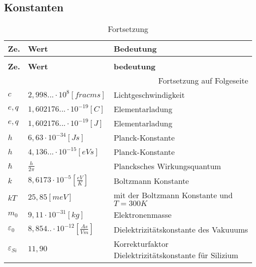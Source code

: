 \documentclass[12pt,a4paper]{report}%
\numberwithin{equation}{section}
\def\bracks#1{\left[ #1 \right]}
\begin{document}
	\subsection{Konstanten} \label{ch:constants}
	\renewcommand{\arraystretch}{1.5}
	
	\begin{longtable} {|p{0.6cm}|p{4.4cm}|p{8.4cm}|} \hline
	\textbf{Ze.} & \textbf{Wert} & \textbf{Bedeutung}\\
	\hline
	\endfirsthead %
	\caption{Fortsetzung}\\ \hline
	\textbf{Ze.} & \textbf{Wert} & \textbf{bedeutung}\\
	\hline
	\endhead %
	\multicolumn{3}{r}{Fortsetzung auf Folgeseite}\\
	\endfoot
	\hline
	\endlastfoot
	
	$c$ & $2,998...\cdot 10^8 \bracks{frac{m}{s}}$ & Lichtgeschwindigkeit\\ \hline
	$e,q$ & $1,602176...\cdot 10^{-19}\bracks{C}$ & Elementarladung\\ \hline
	$e,q$ & $1,602176...\cdot 10^{-19}\bracks{J}$ & Elementarladung\\ \hline
	$h$ & $6,63 \cdot 10^{-34} \bracks{Js}$ & Planck-Konstante\\ \hline
	$h$ & $4,136...\cdot 10^{-15} \bracks{eVs}$ & Planck-Konstante\\ \hline
	$\hbar$ & $\frac{h}{2\pi}$ & Plancksches Wirkungsquantum\\ \hline
	$k$ & $8,6173 \cdot 10^{-5} \bracks{\frac{eV}{K}}$ & Boltzmann Konstante\\ \hline
	$kT$ & $25,85 \bracks{meV}$ & mit der Boltzmann Konstante und $T=300K$ \\ \hline
	$m_0$ & $9,11 \cdot 10^{-31} \bracks{kg}$ & Elektronenmasse\\ \hline
	 
	
	$\varepsilon_0$ & $8,854..\cdot 10^{-12}\bracks{\frac{As}{Vm}}$ & Dielektrizitätskonstante des Vakuuums \\ \hline
	$\varepsilon_{Si}$ & $11,90$ & Korrekturfaktor Dielektrizitätskonstante für Silizium\\ \hline
	\end{longtable}
	\renewcommand{\arraystretch}{1}
  
\end{document}
